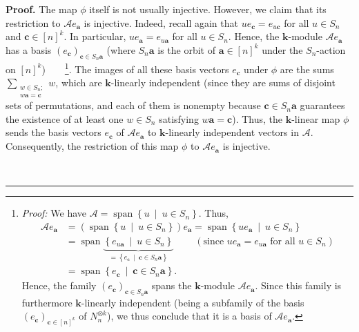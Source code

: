 \documentclass[numbers=enddot,12pt,final,onecolumn,notitlepage]{scrartcl}%
\numberwithin{exer}{subsection}
\theoremstyle{definition}
\newenvironment{proof}[1][Proof]{\noindent\textbf{#1.} }{\ \rule{0.5em}{0.5em}}
\let\sumnonlimits\sum
\renewcommand{\sum}{\sumnonlimits\limits}
\begin{document}
\begin{proof}
The map $\phi$ itself is not usually injective. However, we claim that its
restriction to $\mathcal{A}e_{\mathbf{a}}$ is injective. Indeed, recall again
that $ue_{\mathbf{c}}=e_{u\mathbf{c}}$ for all $u\in S_{n}$ and $\mathbf{c}%
\in\left[  n\right]  ^{k}$. In particular, $ue_{\mathbf{a}}=e_{u\mathbf{a}}$
for all $u\in S_{n}$. Hence, the $\mathbf{k}$-module $\mathcal{A}%
e_{\mathbf{a}}$ has a basis $\left(  e_{\mathbf{c}}\right)  _{\mathbf{c}\in
S_{n}\mathbf{a}}$ (where $S_{n}\mathbf{a}$ is the orbit of $\mathbf{a}%
\in\left[  n\right]  ^{k}$ under the $S_{n}$-action on $\left[  n\right]
^{k}$)\ \ \ \ \footnote{\textit{Proof:} We have $\mathcal{A}%
=\operatorname*{span}\left\{  u\ \mid\ u\in S_{n}\right\}  $. Thus,
\begin{align*}
\mathcal{A}e_{\mathbf{a}}  &  =\left(  \operatorname*{span}\left\{
u\ \mid\ u\in S_{n}\right\}  \right)  e_{\mathbf{a}}=\operatorname*{span}%
\left\{  ue_{\mathbf{a}}\ \mid\ u\in S_{n}\right\} \\
&  =\operatorname*{span}\underbrace{\left\{  e_{u\mathbf{a}}\ \mid\ u\in
S_{n}\right\}  }_{=\left\{  e_{\mathbf{c}}\ \mid\ \mathbf{c}\in S_{n}%
\mathbf{a}\right\}  }\ \ \ \ \ \ \ \ \ \ \left(  \text{since }ue_{\mathbf{a}%
}=e_{u\mathbf{a}}\text{ for all }u\in S_{n}\right) \\
&  =\operatorname*{span}\left\{  e_{\mathbf{c}}\ \mid\ \mathbf{c}\in
S_{n}\mathbf{a}\right\}  .
\end{align*}
Hence, the family $\left(  e_{\mathbf{c}}\right)  _{\mathbf{c}\in
S_{n}\mathbf{a}}$ spans the $\mathbf{k}$-module $\mathcal{A}e_{\mathbf{a}}$.
Since this family is furthermore $\mathbf{k}$-linearly independent (being a
subfamily of the basis $\left(  e_{\mathbf{c}}\right)  _{\mathbf{c}\in\left[
n\right]  ^{k}}$ of $N_{n}^{\otimes k}$), we thus conclude that it is a basis
of $\mathcal{A}e_{\mathbf{a}}$.}. The images of all these basis vectors
$e_{\mathbf{c}}$ under $\phi$ are the sums $\sum_{\substack{w\in
S_{n};\\w\mathbf{a}=\mathbf{c}}}w$, which are $\mathbf{k}$-linearly
independent (since they are sums of disjoint sets of permutations, and each of
them is nonempty because $\mathbf{c}\in S_{n}\mathbf{a}$ guarantees the
existence of at least one $w\in S_{n}$ satisfying $w\mathbf{a}=\mathbf{c}$).
Thus, the $\mathbf{k}$-linear map $\phi$ sends the basis vectors
$e_{\mathbf{c}}$ of $\mathcal{A}e_{\mathbf{a}}$ to $\mathbf{k}$-linearly
independent vectors in $\mathcal{A}$. Consequently, the restriction of this
map $\phi$ to $\mathcal{A}e_{\mathbf{a}}$ is injective.


\end{proof}
\end{document}
